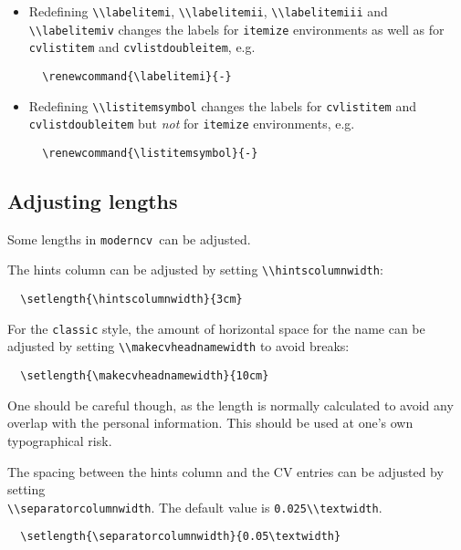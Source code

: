 \documentclass[a4paper, 11pt]{article}
\newcommand{\code}[1]{\lstinline!#1!}
\newcommand{\moderncv}{\code{moderncv}}
\newcommand{\Moderncv}{\moderncv~}
\begin{document}
\begin{itemize}
  \item Redefining \code{\\labelitemi}, \code{\\labelitemii}, \code{\\labelitemiii} and \code{\\labelitemiv} changes the labels for \code{itemize} environments as well as for \code{cvlistitem} and \code{cvlistdoubleitem}, e.g.
  \begin{lstlisting}
  \renewcommand{\labelitemi}{-}
  \end{lstlisting}
  \item Redefining \code{\\listitemsymbol} changes the labels for \code{cvlistitem} and \code{cvlistdoubleitem} but \emph{not} for \code{itemize} environments, e.g.
  \begin{lstlisting}
  \renewcommand{\listitemsymbol}{-}
\end{lstlisting}
\end{itemize}

\subsection{Adjusting lengths}\label{subsection:adjusting:lengths}
Some lengths in \Moderncv can be adjusted.

The hints column can be adjusted by setting \code{\\hintscolumnwidth}:
\begin{lstlisting}
  \setlength{\hintscolumnwidth}{3cm}
\end{lstlisting}

For the \code{classic} style, the amount of horizontal space for the name can be adjusted by setting \code{\\makecvheadnamewidth} to avoid breaks:
\begin{lstlisting}
  \setlength{\makecvheadnamewidth}{10cm}
\end{lstlisting}
One should be careful though, as the length is normally calculated to avoid any overlap with the personal information.
This should be used at one's own typographical risk.

The spacing between the hints column and the CV entries can be adjusted by setting\\
\code{\\separatorcolumnwidth}. The default value is \code{0.025\\textwidth}.
\begin{lstlisting}
  \setlength{\separatorcolumnwidth}{0.05\textwidth}
\end{lstlisting}
\end{document}
